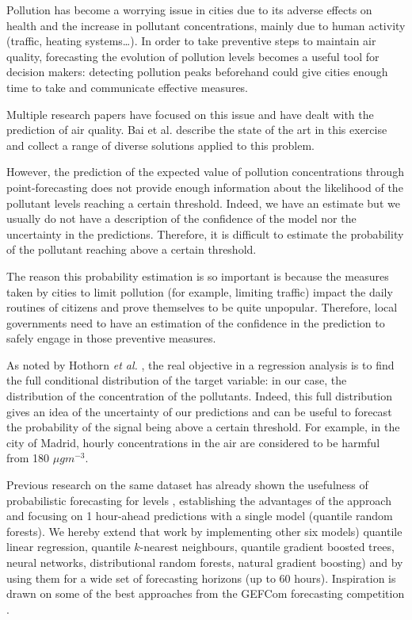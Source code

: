 \documentclass[a4paper,3p,sort&compress]{elsarticle}
\begin{document}
Pollution has become a worrying issue in cities due to its adverse
effects on health and the increase in pollutant concentrations, mainly
due to human activity (traffic, heating systems\ldots). In order to
take preventive steps to maintain air quality, forecasting the
evolution of pollution levels becomes a useful tool for decision
makers: detecting pollution peaks beforehand could give cities enough
time to take and communicate effective measures.

Multiple research papers have focused on this issue and have dealt
with the prediction of air quality. Bai et al. \cite{bai_air_2018}
describe the state of the art in this exercise and collect a range
of diverse solutions applied to this problem.

However, the prediction of the expected value of pollution
concentrations through point-forecasting does not provide enough
information about the likelihood of the pollutant levels reaching a
certain threshold. Indeed, we have an estimate but we usually do not
have a description of the confidence of the model nor the uncertainty
in the predictions. Therefore, it is difficult to estimate the
probability of the pollutant reaching above a certain threshold.

The reason this probability estimation is so important is because the
measures taken by cities to limit pollution (for example, limiting
traffic) impact the daily routines of citizens and prove themselves to
be quite unpopular. Therefore, local governments need to have an
estimation of the confidence in the prediction to safely engage in
those preventive measures.


As noted by Hothorn \emph{et al.} \cite{hothorn_conditional_2014}, the real
objective in a regression analysis is to find the full conditional distribution
of the target variable: in our case, the distribution of the concentration of
the pollutants. Indeed, this full distribution gives an idea of the uncertainty
of our predictions and can be useful to forecast the probability of the signal
being above a certain threshold. For example, in the city of Madrid, hourly \no
concentrations in the air are considered to be harmful from 180 $\mu g m^{-3}$.

Previous research on the same dataset has already shown the usefulness of
probabilistic forecasting for \no levels \cite{proba_aznarte}, establishing the
advantages of the approach and focusing on 1 hour-ahead predictions with a
single model (quantile random forests). We hereby extend that work by
implementing other six models)
  quantile linear regression, 
  quantile $k$-nearest neighbours, 
 quantile gradient boosted trees, 
 neural networks, 
 distributional random forests, 
 natural gradient boosting) and by using them for a wide set of
forecasting horizons (up to 60 hours). Inspiration is drawn on some of the best
approaches from the GEFCom forecasting competition
\cite{quantileknnmangalova,hong_probabilistic_2016}.
\end{document}
